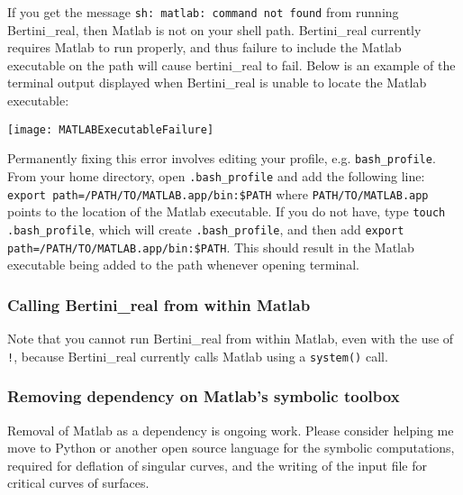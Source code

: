If you get the message {\tt sh: matlab: command not found} from running Bertini\_real, then Matlab is not on your shell path.  Bertini\_real currently requires Matlab to run properly, and thus failure to include the Matlab executable on the path will cause bertini\_real to fail. Below is an example of the terminal output displayed when Bertini\_real is unable to locate the Matlab executable: 
 
\begin{center}\begin{minipage}{0.9\linewidth}
\centering
\texttt{[image: MATLABExecutableFailure]}
\end{minipage}\end{center}

Permanently fixing this error involves editing your profile, e.g. \texttt{bash\_profile}. From your home directory, open \texttt{.bash\_profile} and add the following line: \texttt{export \gls{path}=/PATH/TO/MATLAB.app/bin:\$PATH} where \texttt{PATH/TO/MATLAB.app} points to the location of the Matlab executable. If you do not have, type \texttt{touch .bash\_profile}, which will create \texttt{.bash\_profile}, and then add \texttt{export \gls{path}=/PATH/TO/MATLAB.app/bin:\$PATH}. This should result in the Matlab executable being added to the path whenever opening terminal. 




\subsubsection{Calling Bertini\_real from within Matlab}

Note that you cannot run Bertini\_real from within Matlab, even with the use of {\tt !}, because Bertini\_real currently calls Matlab using a {\tt system()} call. 


\subsubsection*{Removing dependency on Matlab's symbolic toolbox}



Removal of Matlab as a dependency is ongoing work.  Please consider helping me move to Python or another open source language for the symbolic computations, required for deflation of singular curves, and the writing of the input file for critical curves of surfaces.
